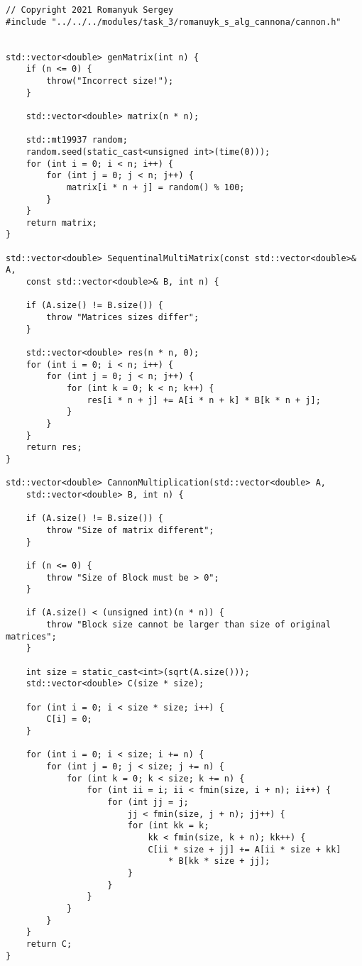 \documentclass{report}
\begin{document}
\begin{lstlisting}
// Copyright 2021 Romanyuk Sergey
#include "../../../modules/task_3/romanuyk_s_alg_cannona/cannon.h"


std::vector<double> genMatrix(int n) {
    if (n <= 0) {
        throw("Incorrect size!");
    }

    std::vector<double> matrix(n * n);

    std::mt19937 random;
    random.seed(static_cast<unsigned int>(time(0)));
    for (int i = 0; i < n; i++) {
        for (int j = 0; j < n; j++) {
            matrix[i * n + j] = random() % 100;
        }
    }
    return matrix;
}

std::vector<double> SequentinalMultiMatrix(const std::vector<double>& A,
    const std::vector<double>& B, int n) {

    if (A.size() != B.size()) {
        throw "Matrices sizes differ";
    }

    std::vector<double> res(n * n, 0);
    for (int i = 0; i < n; i++) {
        for (int j = 0; j < n; j++) {
            for (int k = 0; k < n; k++) {
                res[i * n + j] += A[i * n + k] * B[k * n + j];
            }
        }
    }
    return res;
}

std::vector<double> CannonMultiplication(std::vector<double> A,
    std::vector<double> B, int n) {

    if (A.size() != B.size()) {
        throw "Size of matrix different";
    }

    if (n <= 0) {
        throw "Size of Block must be > 0";
    }

    if (A.size() < (unsigned int)(n * n)) {
        throw "Block size cannot be larger than size of original matrices";
    }

    int size = static_cast<int>(sqrt(A.size()));
    std::vector<double> C(size * size);

    for (int i = 0; i < size * size; i++) {
        C[i] = 0;
    }

    for (int i = 0; i < size; i += n) {
        for (int j = 0; j < size; j += n) {
            for (int k = 0; k < size; k += n) {
                for (int ii = i; ii < fmin(size, i + n); ii++) {
                    for (int jj = j;
                        jj < fmin(size, j + n); jj++) {
                        for (int kk = k;
                            kk < fmin(size, k + n); kk++) {
                            C[ii * size + jj] += A[ii * size + kk]
                                * B[kk * size + jj];
                        }
                    }
                }
            }
        }
    }
    return C;
}




\end{lstlisting}
\end{document}
